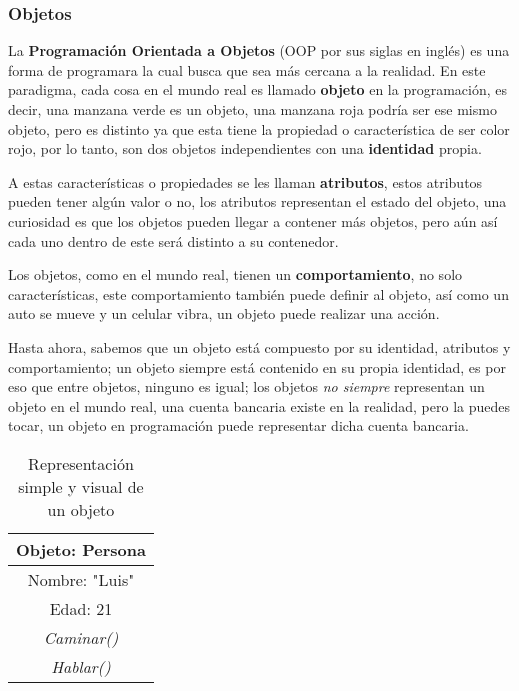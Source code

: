 \subsubsection{Objetos}
\hspace{0.55cm}La \textbf{Programación Orientada a Objetos} (OOP por sus siglas en inglés) es una forma de programara la cual busca que sea más cercana a la realidad. En este paradigma, cada cosa en el mundo real es llamado \textbf{objeto} en la programación, es decir, una manzana verde es un objeto, una manzana roja podría ser ese mismo objeto, pero es distinto ya que esta tiene la propiedad o característica de ser color rojo, por lo tanto, son dos objetos independientes con una \textbf{identidad} propia.

A estas características o propiedades se les llaman \textbf{atributos}, estos atributos pueden tener algún valor o  no, los atributos representan el estado del objeto, una curiosidad es que los objetos pueden llegar a contener más objetos, pero aún así cada uno dentro de este será distinto a su contenedor.

Los objetos, como en el mundo real, tienen un \textbf{comportamiento}, no solo características, este comportamiento también puede definir al objeto, así como un auto se mueve y un celular vibra, un objeto puede realizar una acción.

Hasta ahora, sabemos que un objeto está compuesto por su identidad, atributos y comportamiento; un objeto siempre está contenido en su propia identidad, es por eso que entre objetos, ninguno es igual; los objetos \textit{no siempre} representan un objeto en el mundo real, una cuenta bancaria existe en la realidad, pero la puedes tocar, un objeto en programación puede representar dicha cuenta bancaria.
\begin{table}[H]
    \begin{center}
        \caption{Representación simple y visual de un objeto}
        \label{tab: 7}
        \begin{tabular}{|c|}
            \hline
            \textbf{Objeto: Persona} \\
            \hline
            Nombre: "Luis" \\
            Edad: 21 \\
            \hline
            \textit{Caminar()} \\
            \textit{Hablar()} \\
            \hline
        \end{tabular}
    \end{center}
\end{table}


